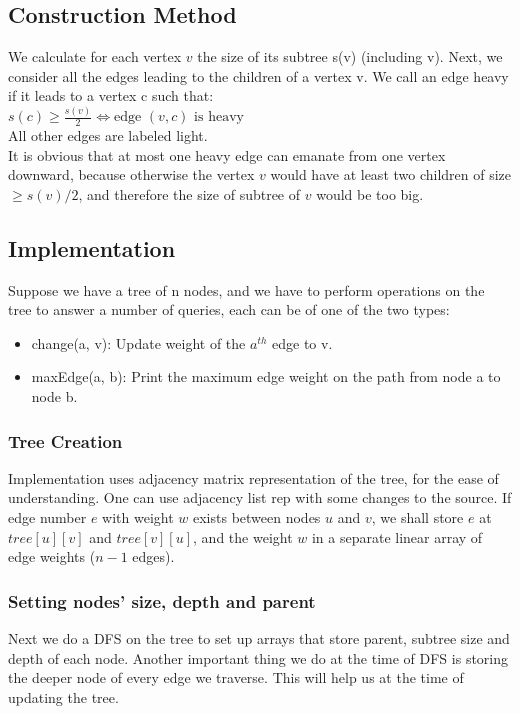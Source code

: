 \documentclass[12pt]{article}
\begin{document}
\subsection{Construction Method}
We calculate for each vertex $v$ the size of its subtree s(v) (including v).
Next, we consider all the edges leading to the children of a vertex v. We call an edge heavy if it leads to a vertex c such that:\\
$s(c) \ge \frac{s(v)}{2} \iff \text{edge }(v, c)\text{ is heavy}$ \\
All other edges are labeled light.\\
It is obvious that at most one heavy edge can emanate from one vertex downward, because otherwise the vertex $v$ would have at least two children of size $ \geq s(v)/2$, and therefore the size of subtree of $v$ would be too big.

\subsection{Implementation}

Suppose we have a tree  of n nodes, and we have to perform operations on the tree to answer a number of queries, each can be of one of the two types:
\begin{itemize}
    \item change(a, v): Update weight of the $a^{th}$ edge to v.
\item  maxEdge(a, b):  Print the maximum edge weight on the path from node a to node b. 
\end{itemize}
\subsubsection*{Tree Creation}
 Implementation uses adjacency matrix representation of the tree, for the ease of understanding. One can use adjacency list rep with some changes to the source. If edge number $e$ with weight $w$ exists between nodes $u$ and $v$, we shall store $e$ at $tree[u][v]$ and $tree[v][u]$, and the weight $w$ in a separate linear array of edge weights ($n-1$ edges).    
 \subsubsection*{Setting nodes' size, depth and parent}
 Next we do a DFS on the tree to set up arrays that store parent, subtree size and depth of each node. Another important thing we do at the time of DFS is storing the deeper node of every edge we traverse. This will help us at the time of updating the tree.
\end{document}
